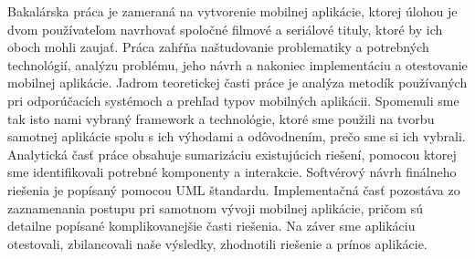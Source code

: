 Bakalárska práca je zameraná na vytvorenie mobilnej aplikácie, ktorej úlohou je dvom používateľom navrhovať spoločné filmové a seriálové tituly, ktoré by ich oboch mohli zaujať. Práca zahŕňa naštudovanie problematiky a potrebných technológií, analýzu problému, jeho návrh a nakoniec implementáciu a otestovanie mobilnej aplikácie.
Jadrom teoretickej časti práce je analýza metodík používaných pri odporúčacích systémoch a prehľad typov mobilných aplikácii. Spomenuli sme tak isto nami vybraný framework a technológie, ktoré sme použili na tvorbu samotnej aplikácie spolu s ich výhodami a odôvodnením, prečo sme si ich vybrali. Analytická časť práce obsahuje sumarizáciu existujúcich riešení, pomocou ktorej sme identifikovali potrebné komponenty a interakcie. Softvérový návrh finálneho riešenia je popísaný pomocou UML štandardu.
Implementačná časť pozostáva zo zaznamenania postupu pri samotnom vývoji mobilnej aplikácie, pričom sú detailne popísané komplikovanejšie časti riešenia. Na záver sme aplikáciu otestovali, zbilancovali naše výsledky, zhodnotili riešenie a prínos aplikácie.